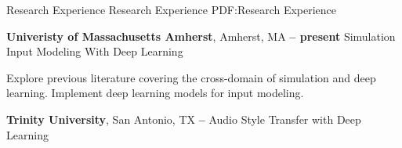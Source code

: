 \Section
{Research Experience}
{Research Experience}
{PDF:Research Experience}

\Entry
\textbf{Univeristy of Massachusetts Amherst},
Amherst, MA 
\dotfill
\textbf{ -- present}
\Gap
Simulation Input Modeling With Deep Learning
\begin{Detail}
    \SubBulletItem
    Explore previous literature covering the cross-domain of simulation and deep learning.
    \SubBulletItem
    Implement deep learning models for input modeling.
\end{Detail}

\BigGap
\Entry
\textbf{Trinity University},
San Antonio, TX
\dotfill
\textbf{ -- }
\Gap
Audio Style Transfer with Deep Learning
\begin{Detail}
    \SubBulletItem
\end{Detail}